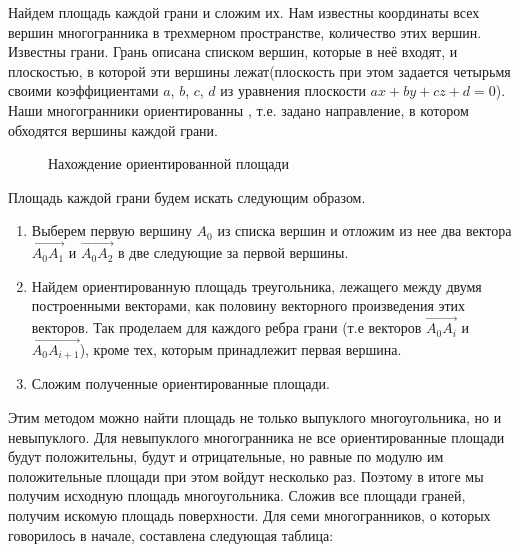 \documentclass[a4paper,12pt, titlepage]{article}
\begin{document}
Найдем площадь каждой грани и сложим их.  Нам известны координаты всех 
вершин многогранника в трехмерном пространстве, количество этих вершин. Известны грани. Грань описана списком вершин,
которые  в неё входят, и плоскостью, в которой эти вершины лежат(плоскость при этом задается четырьмя своими 
 коэффициентами $a$, $b$, $c$, $d$ из уравнения плоскости $a x + b y + c z + d = 0$). 
Наши многогранники ориентированны \cite{zor} , т.е. задано направление, в котором обходятся вершины каждой грани.

\begin{figure}[h]
\noindent{}
\caption{Нахождение ориентированной площади}
\label{sarea}
\end{figure}

Площадь каждой грани будем искать следующим образом.
\begin{enumerate}
\item Выберем первую вершину $A_{0}$ из списка вершин и отложим из нее два вектора $\overrightarrow{A_{0}A_{1}}$ 
и $\overrightarrow{A_{0}A_{2}}$ в две следующие за первой вершины.
\item Найдем ориентированную площадь треугольника, лежащего между двумя построенными векторами, как половину
векторного произведения этих векторов.
Так проделаем для каждого ребра грани (т.е векторов $\overrightarrow{A_{0}A_{i}}$ 
и $\overrightarrow{A_{0}A_{i+1}}$), кроме тех, которым принадлежит первая вершина. 
\item Сложим полученные ориентированные площади.
\end{enumerate}

Этим методом можно найти площадь не только выпуклого многоугольника, но и невыпуклого. Для невыпуклого многогранника 
не все ориентированные площади будут положительны, будут  и отрицательные, но равные по модулю им положительные площади 
при этом войдут несколько раз. Поэтому в итоге мы получим исходную площадь  многоугольника. Сложив все площади граней, получим
искомую площадь поверхности. Для семи многогранников, о которых говорилось в начале, составлена следующая таблица:
 
\end{document}
